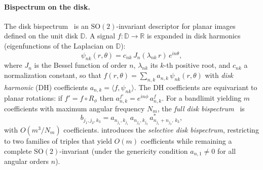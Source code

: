 \documentclass{article}
\theoremstyle{definition}
\theoremstyle{remark}
\newcommand{\R}{\mathbb{R}}
\newcommand{\SO}{\mathrm{SO}}
\theoremstyle{definition}
\begin{document}
\paragraph{Bispectrum on the disk.}
The disk bispectrum~\citep{zhao2014rotationally, myers2025selective}
is an $\SO(2)$-invariant descriptor for planar images defined on the
unit disk $\mathbb{D}$. A signal $f : \mathbb{D} \to \R$ is expanded in
disk harmonics (eigenfunctions of the Laplacian on $\mathbb{D}$):
\begin{equation}\label{eq:disk-harmonics}
  \psi_{nk}(r,\theta) = c_{nk}\, J_n(\lambda_{nk}\, r)\, e^{in\theta},
\end{equation}
where $J_n$ is the Bessel function of order $n$, $\lambda_{nk}$ its
$k$-th positive root, and $c_{nk}$ a normalization constant, so that
$f(r,\theta) = \sum_{n,k} a_{n,k}\, \psi_{nk}(r,\theta)$ with
\emph{disk harmonic} (DH) coefficients
$a_{n,k} = \langle f, \psi_{nk} \rangle$.
The DH coefficients are equivariant to planar
rotations: if $f' = f \circ R_\phi$ then
$a^{f'}_{n,k} = e^{in\phi}\, a^{f}_{n,k}$.
For a bandlimit yielding $m$ coefficients with maximum angular frequency
$N_m$, the \emph{full disk bispectrum}~\citep{zhao2014rotationally} is
\begin{equation}\label{eq:bispectrum-disk}
  b_{j_1,j_2,k_3}
  = a_{n_{j_1},k_{j_1}}\, a_{n_{j_2},k_{j_2}}\,
    a_{n_{j_1}+n_{j_2},\,k_3}^{*},
\end{equation}
with $O(m^3 / N_m)$ coefficients. \citet{myers2025selective} introduces
the \emph{selective disk bispectrum}, restricting to two families of
triples that yield $O(m)$ coefficients while remaining a complete
$\SO(2)$-invariant (under the genericity condition $a_{n,1}\neq 0$ for
all angular orders $n$).
\end{document}
